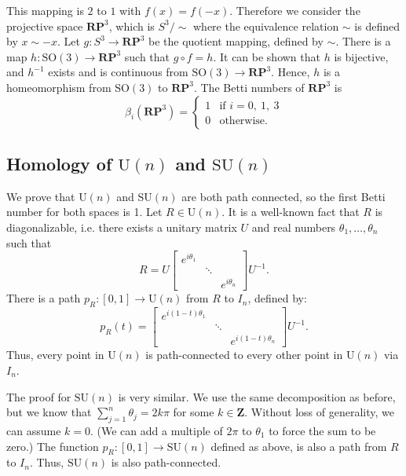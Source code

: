 \documentclass[letterpaper,11pt]{article}
\newcommand{\inv}{^{-1}}
\newcommand{\reals}{\mathbf{R}}
\newcommand{\ints}{\mathbf{Z}}
\newcommand{\proj}{\mathbf{P}}
\newcommand{\MG}[2]{{\text{#1}(#2)}}
\newcommand{\Un}{\MG{U}{n}}
\newcommand{\SUn}{\MG{SU}{n}}
\begin{document}
This mapping is $2$ to $1$ with $f(x) = f(-x)$.
Therefore we consider the projective space $\reals\proj^3$, which is $S^3/\sim$ where the equivalence relation $\sim$ is defined by $x \sim -x$.
Let $g:S^3 \to \reals\proj^{3}$ be the quotient mapping, defined by $\sim$.
There is a map $h: \MG{SO}{3} \to \reals\proj^3$ such that $g\circ f = h$.
It can be shown that $h$ is bijective, and $h^{-1}$ exists and is continuous from $\MG{SO}{3} \rightarrow \reals\proj^3$.
Hence, $h$ is a homeomorphism from $\MG{SO}{3}$ to $\reals\proj^3$.
The Betti numbers of $\reals\proj^3$ is
\[
  \beta_i(\reals\proj^3) = \left\{
  \begin{array}{ll}
    1 & \mbox{if } i = 0,\ 1,\ 3\\
    0 & \mbox{otherwise.}
  \end{array}
  \right.
\]

\subsection{Homology of $\Un$ and $\SUn$}
We prove that $\Un$ and $\SUn$ are both path connected, so the first Betti number for both spaces is 1.
Let $R\in\Un$.
It is a well-known fact that $R$ is diagonalizable, i.e. there exists a unitary matrix $U$ and real numbers $\theta_1,\dots,\theta_n$ such that
\[
  R = U\begin{bmatrix} e^{i\theta_1} & & \\ & \ddots & \\ & & e^{i\theta_n} \end{bmatrix} U\inv.
\]
There is a path $p_R: [0,1] \to \Un$ from $R$ to $I_n$, defined by:
\[
  p_R(t) = \begin{bmatrix} e^{i(1-t)\theta_1} & & \\ & \ddots & \\ & & e^{i(1-t)\theta_n} \end{bmatrix} U\inv.
\]
Thus, every point in $\Un$ is path-connected to every other point in $\Un$ via $I_n$.

The proof for $\SUn$ is very similar.
We use the same decomposition as before, but we know that $\sum_{j=1}^n \theta_j =2k\pi$ for some $k\in\ints$.
Without loss of generality, we can assume $k = 0$.
(We can add a multiple of $2\pi$ to $\theta_1$ to force the sum to be zero.)
The function $p_R: [0,1] \to \SUn$ defined as above, is also a path from $R$ to $I_n$.
Thus, $\SUn$ is also path-connected.
\end{document}
